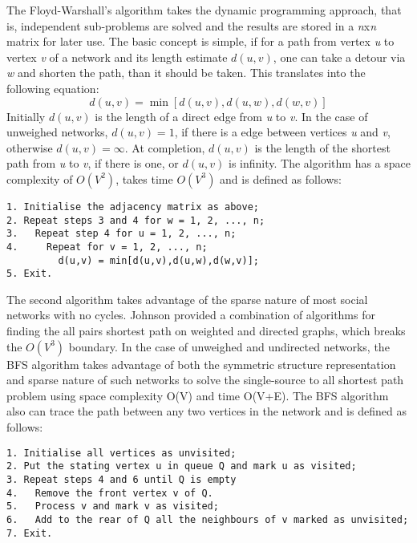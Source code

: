 The Floyd-Warshall's algorithm takes the dynamic programming approach, that is,
independent sub-problems are solved and the results are stored in a \emph{n}x\emph{n}
matrix for later use. The basic concept is simple, if for a path from vertex \emph{u} to
vertex \emph{v} of a network and its length estimate $d(u,v)$, one can take a detour via
\emph{w} and shorten the path, than it should be taken. This translates into the
following equation:
\begin{equation}\label{floydalgo}
    d(u,v) = \min[d(u,v),d(u,w),d(w,v)]
\end{equation}
Initially $d(u,v)$ is the length of a direct edge from \emph{u} to \emph{v}. In the case
of unweighed networks, $d(u,v)= 1$, if there is a edge between vertices \emph{u} and
\emph{v}, otherwise $d(u,v) = \infty$. At completion, $d(u,v)$ is the length of the
shortest path from \emph{u} to \emph{v}, if there is one, or $d(u,v)$ is infinity. The
algorithm has a space complexity of $O(V^2)$, takes time $O(V^3)$ and is defined as
follows:
\begin{verbatim}
1. Initialise the adjacency matrix as above;
2. Repeat steps 3 and 4 for w = 1, 2, ..., n;
3.   Repeat step 4 for u = 1, 2, ..., n;
4.     Repeat for v = 1, 2, ..., n;
         d(u,v) = min[d(u,v),d(u,w),d(w,v)];
5. Exit.
\end{verbatim}

The second algorithm takes advantage of the sparse nature of most social networks with no
cycles. Johnson \cite{Johnson1977} provided a combination of algorithms for finding the
all pairs shortest path on weighted and directed graphs, which breaks the $O(V^3)$
boundary. In the case of unweighed and undirected networks, the BFS algorithm takes
advantage of both the symmetric structure representation and sparse nature of such
networks to solve the single-source to all shortest path problem using space complexity
O(V) and time O(V+E). The BFS algorithm also can trace the path between any two vertices
in the network and is defined as follows:
\begin{verbatim}
1. Initialise all vertices as unvisited;
2. Put the stating vertex u in queue Q and mark u as visited;
3. Repeat steps 4 and 6 until Q is empty
4.   Remove the front vertex v of Q.
5.   Process v and mark v as visited;
6.   Add to the rear of Q all the neighbours of v marked as unvisited;
7. Exit.
\end{verbatim}

